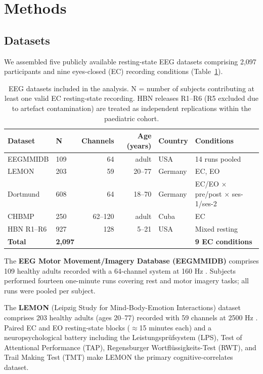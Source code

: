\section{Methods}
\label{sec:methods}

\subsection{Datasets}
\label{sec:datasets}

We assembled five publicly available resting-state EEG datasets comprising 2,097 participants and nine eyes-closed (EC) recording conditions (Table~\ref{tab:datasets}).

\begin{table}[htbp]
\centering
\caption{EEG datasets included in the analysis. N = number of subjects contributing at least one valid EC resting-state recording. HBN releases R1--R6 (R5 excluded due to artefact contamination) are treated as independent replications within the paediatric cohort.}
\label{tab:datasets}
\begin{tabular}{llrrll}
\toprule
\textbf{Dataset} & \textbf{N} & \textbf{Channels} & \textbf{Age (years)} & \textbf{Country} & \textbf{Conditions} \\
\midrule
EEGMMIDB & 109 & 64 & adult & USA & 14 runs pooled \\
LEMON & 203 & 59 & 20--77 & Germany & EC, EO \\
Dortmund & 608 & 64 & 18--70 & Germany & EC/EO $\times$ pre/post $\times$ ses-1/ses-2 \\
CHBMP & 250 & 62--120 & adult & Cuba & EC \\
HBN R1--R6 & 927 & 128 & 5--21 & USA & Mixed resting \\
\midrule
\textbf{Total} & \textbf{2,097} & & & & \textbf{9 EC conditions} \\
\bottomrule
\end{tabular}
\end{table}

The \textbf{EEG Motor Movement/Imagery Database (EEGMMIDB)} comprises 109 healthy adults recorded with a 64-channel system at 160 Hz \parencite{goldberger2000physiobank,schalk2004bci2000}. Subjects performed fourteen one-minute runs covering rest and motor imagery tasks; all runs were pooled per subject.

The \textbf{LEMON} (Leipzig Study for Mind-Body-Emotion Interactions) dataset comprises 203 healthy adults (ages 20--77) recorded with 59 channels at 2500 Hz \parencite{babayan2019lemon}. Paired EC and EO resting-state blocks ($\approx$15 minutes each) and a neuropsychological battery including the Leistungsprüfsystem (LPS), Test of Attentional Performance (TAP), Regensburger Wortflüssigkeits-Test (RWT), and Trail Making Test (TMT) make LEMON the primary cognitive-correlates dataset.

